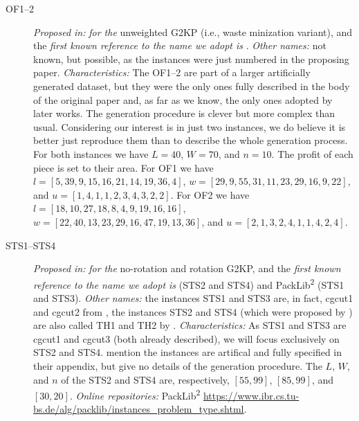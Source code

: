 \documentclass[ppgc,prop-tese,english,formais,babel]{iiufrgs}
\begin{document}
\begin{description}
\item [OF1--2] \emph{Proposed in:} \citet{oliveira:1990} \emph{for the} unweighted G2KP (i.e., waste minization variant), and the \emph{first known reference to the name we adopt is} \citet{hifi:2001}. \emph{Other names:} not known, but possible, as the instances were just numbered in the proposing paper. \emph{Characteristics: } The OF1--2 are part of a larger artificially generated dataset, but they were the only ones fully described in the body of the original paper and, as far as we know, the only ones adopted by later works. The generation procedure is clever but more complex than usual. Considering our interest is in just two instances, we do believe it is better just reproduce them than to describe the whole generation process. For both instances we have \(L = 40\), \(W = 70\), and \(n = 10\). The profit of each piece is set to their area. For OF1 we have \(l = [5, 39, 9, 15, 16, 21, 14, 19, 36, 4]\), \(w = [29, 9, 55, 31, 11, 23, 29, 16, 9, 22]\), and \(u = [1, 4, 1, 1, 2, 3, 4, 3, 2, 2]\). For OF2 we have \(l = [18, 10, 27, 18, 8, 4, 9, 19, 16, 16]\), \(w = [22, 40, 13, 23, 29, 16, 47, 19, 13, 36]\), and \(u = [2, 1, 3, 2, 4, 1, 1, 4, 2, 4]\).
\item [STS1--STS4] \emph{Proposed in:} \citet{tschoke:1995} \emph{for the} no-rotation and rotation G2KP, and the \emph{first known reference to the name we adopt is} \citet{alvarez:2002:tabu} (STS2 and STS4) and PackLib\textsuperscript{2} (STS1 and STS3). \emph{Other names:} the instances STS1 and STS3 are, in fact, cgcut1 and cgcut2 from \citet{cw:1977}, the instances STS2 and STS4 (which were proposed by \citet{tschoke:1995}) are also called TH1 and TH2 by \citet{fayard:1998}. \emph{Characteristics: } As STS1 and STS3 are cgcut1 and cgcut3 (both already described), we will focus exclusively on STS2 and STS4. \citet{tschoke:1995} mention the instances are artifical and fully specified in their appendix, but give no details of the generation procedure. The \(L\), \(W\), and \(n\) of the STS2 and STS4 are, respectively, \([55, 99]\), \([85, 99]\), and \([30, 20]\). \emph{Online repositories:} PackLib\textsuperscript{2} \url{https://www.ibr.cs.tu-bs.de/alg/packlib/instances_problem_type.shtml}.

\end{description}
\end{document}
